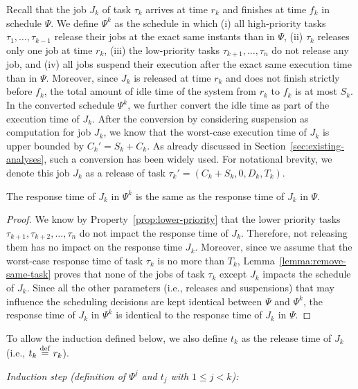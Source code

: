 Recall that the job $J_{k}$ of task $\tau_k$ arrives at time $r_k$ and finishes at time $f_k$ in schedule $\Psi$.  We define $\Psi^k$ as the schedule in which (i) all high-priority tasks $\tau_1, \ldots, \tau_{k-1}$ release their jobs at the exact same instants than in $\Psi$, (ii) $\tau_k$ releases only one job at time $r_k$, (iii) the low-priority tasks $\tau_{k+1}, \ldots, \tau_n$ do not release any job, and (iv) all jobs suspend their execution after the exact same execution time than in $\Psi$. Moreover, since $J_k$ is released at time $r_k$ and does not finish strictly before $f_k$, the total amount of idle time of the system from $r_k$ to $f_k$ is at most $S_k$. In the converted schedule $\Psi^k$, we further convert the idle time as part of the execution time of $J_k$. After the conversion by considering suspension as computation for job $J_k$, we know that the worst-case execution time of $J_k$ is upper bounded by $C_k'=S_k+C_k$.  As already discussed in Section~\ref{sec:existing-analyses}, such a conversion has been widely used. For notational brevity, we denote this job $J_k$ as a release of task $\tau_k' = (C_k + S_k, 0, D_k, T_k)$. 

\begin{Lemma}
\label{lemma:psik}
The response time of $J_k$ in $\Psi^k$ is the same as the response time of $J_k$ in $\Psi$.
\end{Lemma}
\begin{proof}
We know by Property~\ref{prop:lower-priority} that the lower priority tasks $\tau_{k+1}, \tau_{k+2}, \ldots, \tau_n$ do not impact the response time of $J_{k}$. Therefore, not releasing them has no impact on the response time $J_k$. Moreover, since we assume that the worst-case response time of task $\tau_k$ is no more than $T_k$, Lemma~\ref{lemma:remove-same-task} proves that none of the jobs of task $\tau_k$ except $J_{k}$ impacts the schedule of $J_{k}$. Since all the other parameters (i.e., releases and suspensions) that may influence the scheduling decisions are kept identical between $\Psi$ and $\Psi^k$, the response time of $J_{k}$ in $\Psi^{k}$ is identical to the response time of $J_{k}$ in $\Psi$.
\end{proof}

To allow the induction defined below, we also define $t_k$ as the release time of $J_k$ (i.e., $t_k \stackrel{\mathrm{def}}{=} r_k$).

\noindent\textit{Induction step (definition of $\Psi^j$ and $t_j$ with $1 \leq j < k$):}

